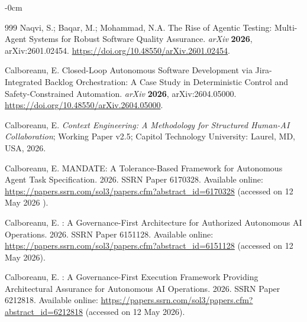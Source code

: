 \documentclass[software,article,accept,pdftex,oneauthor]{Definitions/mdpi}
\def\hl#1{#1}
\begin{document}
\begin{adjustwidth}{-\extralength}{0cm}
\begin{thebibliography}{999}
Naqvi, S.; Baqar, M.; Mohammad, N.A.
\newblock The Rise of Agentic Testing: Multi-Agent Systems for Robust Software
  Quality Assurance. \emph{arXiv}  \textbf{2026},  	arXiv:2601.02454. \url{ 	
https://doi.org/10.48550/arXiv.2601.02454}.

Calboreanu, E.
\newblock Closed-Loop Autonomous Software Development via Jira-Integrated
  Backlog Orchestration: A Case Study in Deterministic Control and
  Safety-Constrained Automation.   \emph{arXiv}  \textbf{2026},  	arXiv:2604.05000. \url{ 	
https://doi.org/10.48550/arXiv.2604.05000}. 

Calboreanu, E.
\newblock \emph{Context Engineering: A Methodology for Structured Human-AI
  Collaboration};  
\newblock Working Paper v2.5; Capitol Technology University: \hl{Laurel, MD, USA,} %
 2026. 

Calboreanu, E.
\newblock \hl{MANDATE:} %
 A Tolerance-Based Framework for Autonomous Agent Task
  Specification. 
 2026. SSRN Paper 6170328. Available online: \url{https://papers.ssrn.com/sol3/papers.cfm?abstract_id=6170328}  (accessed on 12 May 2026%
).

Calboreanu, E.
: A Governance-First Architecture for Authorized Autonomous
  {AI} Operations. 2026.  SSRN Paper 6151128.  Available online:  \url{https://papers.ssrn.com/sol3/papers.cfm?abstract_id=6151128}  (accessed on 12 May 2026).

Calboreanu, E.
: A Governance-First Execution Framework Providing
  Architectural Assurance for Autonomous {AI} Operations. 2026. SSRN Paper 6212818.   Available online:  \url{https://papers.ssrn.com/sol3/papers.cfm?abstract_id=6212818}  (accessed on 12 May 2026).


\end{thebibliography}
\end{adjustwidth}
\end{document}
